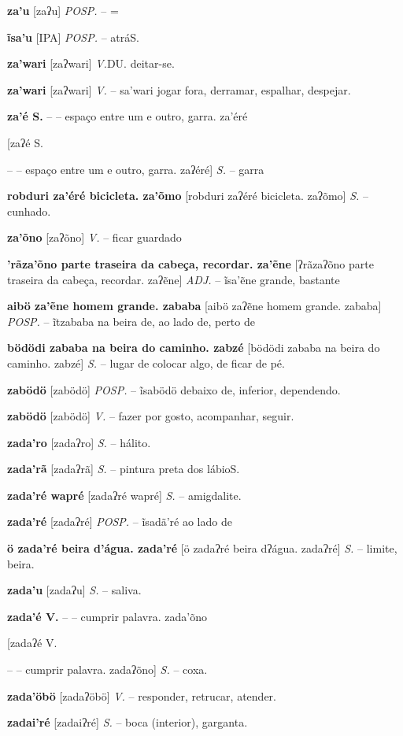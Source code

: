 {{{{{{{{{{{{\textbf{za'u} [zaʔu] \textit{POSP.} -- =

\textbf{ĩsa'u} [IPA] \textit{POSP.} -- atráS.}

\textbf{za'wari} [zaʔwari] \textit{V.}DU. deitar-se.

\textbf{za'wari} [zaʔwari] \textit{V.} -- sa'wari jogar fora, derramar, espalhar, despejar.

\textbf{za'é S.} -- -- espaço entre um e outro, garra. za'éré} [zaʔé S.} -- -- espaço entre um e outro, garra. zaʔéré] \textit{S.} -- garra

\textbf{robduri za'éré bicicleta. za'õmo} [robduri zaʔéré bicicleta. zaʔõmo] \textit{S.} -- cunhado.

\textbf{za'õno} [zaʔõno] \textit{V.} -- ficar guardado

\textbf{'rãza'õno parte traseira da cabeça, recordar. za'ẽne} [ʔrãzaʔõno parte traseira da cabeça, recordar. zaʔẽne] \textit{ADJ.} -- ĩsa'ẽne grande, bastante

\textbf{aibö za'ẽne homem grande. zababa} [aibö zaʔẽne homem grande. zababa] \textit{POSP.} -- ĩtzababa na beira de, ao lado de, perto de

\textbf{bödödi zababa na beira do caminho. zabzé} [bödödi zababa na beira do caminho. zabzé] \textit{S.} -- lugar de colocar algo, de ficar de pé.

\textbf{zabödö} [zabödö] \textit{POSP.} -- ĩsabödö debaixo de, inferior, dependendo.

\textbf{zabödö} [zabödö] \textit{V.} -- fazer por gosto, acompanhar, seguir.

\textbf{zada'ro} [zadaʔro] \textit{S.} -- hálito.

\textbf{zada'rã} [zadaʔrã] \textit{S.} -- pintura preta dos lábioS.}

\textbf{zada'ré wapré} [zadaʔré wapré] \textit{S.} -- amigdalite.

\textbf{zada'ré} [zadaʔré] \textit{POSP.} -- ĩsadã'ré ao lado de

\textbf{ö zada'ré beira d'água. zada'ré} [ö zadaʔré beira dʔágua. zadaʔré] \textit{S.} -- limite, beira.

\textbf{zada'u} [zadaʔu] \textit{S.} -- saliva.

\textbf{zada'é V.} -- -- cumprir palavra. zada'õno} [zadaʔé V.} -- -- cumprir palavra. zadaʔõno] \textit{S.} -- coxa.

\textbf{zada'öbö} [zadaʔöbö] \textit{V.} -- responder, retrucar, atender.

\textbf{zadai'ré} [zadaiʔré] \textit{S.} -- boca (interior), garganta.

}}}}}}
